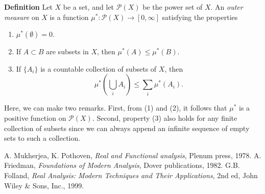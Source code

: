 \documentclass[12pt]{article}
\begin{document}
{\bf Definition} \cite{mukherjea, friedman, folland}
Let $X$ be a set, and let $\mathcal{P}(X)$ be the
power set of $X$. An \emph{outer measure} on $X$ is a function
$\mu^\ast:\mathcal{P}(X)\to [0,\infty]$ satisfying the properties
\begin{enumerate}
\item $\mu^\ast(\emptyset)=0$. 
\item If $A\subset B$ are subsets in $X$, then $\mu^\ast(A)\le \mu^\ast(B)$. 
\item If $\{A_i\}$ is a countable collection of subsets of $X$, 
then 
$$ \mu^\ast(\bigcup_i A_i) \le \sum_i \mu^\ast (A_i).$$
\end{enumerate}

Here, we can make two remarks. First, from (1) and (2), it follows
that $\mu^\ast$ is a positive function on $\mathcal{P}(X)$. Second, 
property (3) also holds for any finite collection of subsets since
we can always append an infinite sequence of empty sets to 
such a collection.

\begin{thebibliography}{9}
 A. Mukherjea, K. Pothoven,
 \emph{Real and Functional analysis},
 Plenum press, 1978.
A. Friedman, 
 \emph{Foundations of Modern Analysis},
Dover publications, 1982. 
 G.B. Folland, \emph{Real Analysis: Modern Techniques and Their Applications}, 2nd ed, John Wiley \& Sons, Inc., 1999.
 \end{thebibliography}
\end{document}
